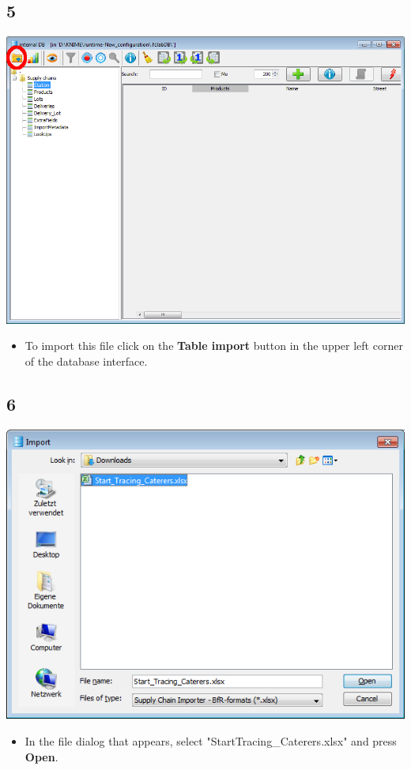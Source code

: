 \documentclass{beamer}
\begin{document}
\subsection{5}
\begin{frame}
	\begin{center}
  		\includegraphics[height=0.6\textheight]{5.png}
	\end{center}
	\begin{itemize}
		\item To import this file click on the \textbf{Table import} button in the upper left corner of the database interface.
	\end{itemize}
\end{frame}

\subsection{6}
\begin{frame}
	\begin{center}
  		\includegraphics[height=0.5\textheight]{6.png}
	\end{center}
	\begin{itemize}
		\item In the file dialog that appears, select "StartTracing\_Caterers.xlsx" and press \textbf{Open}.
	\end{itemize}
\end{frame}
\end{document}
